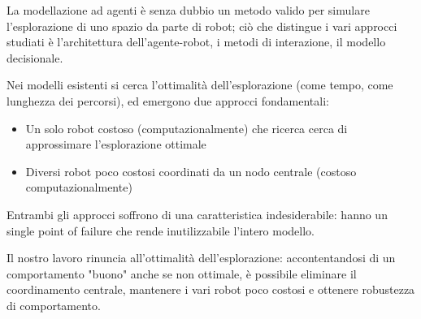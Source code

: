 
La modellazione ad agenti è senza dubbio un metodo valido per simulare l'esplorazione
di uno spazio da parte di robot; ciò che distingue i vari approcci studiati è 
l'architettura dell'agente-robot, i metodi di interazione, il modello decisionale.

Nei modelli esistenti si cerca l'ottimalità dell'esplorazione (come tempo, come lunghezza dei percorsi), ed emergono due approcci fondamentali:
\begin{itemize}
	\item Un solo robot costoso (computazionalmente) che ricerca cerca di approssimare l'esplorazione ottimale
	\item Diversi robot poco costosi coordinati da un nodo centrale (costoso computazionalmente)
\end{itemize}
Entrambi gli approcci soffrono di una caratteristica indesiderabile: hanno un single point of failure che rende inutilizzabile l'intero modello.

Il nostro lavoro rinuncia all'ottimalità dell'esplorazione: accontentandosi di un comportamento "buono" anche se non ottimale, è possibile eliminare il coordinamento centrale, mantenere i vari robot poco costosi e ottenere robustezza di comportamento.
